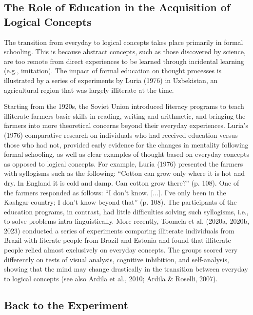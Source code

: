 \documentclass[authordate, reflection, issue]{jote-new-article}
\begin{document}
	\subsection{The Role of Education in the Acquisition of Logical Concepts}



	The transition from everyday to logical concepts takes place primarily in formal schooling. This is because abstract concepts, such as those discovered by science, are too remote from direct experiences to be learned through incidental learning (e.g., imitation). The impact of formal education on thought processes is illustrated by a series of experiments by Luria (1976) in Uzbekistan, an agricultural region that was largely illiterate at the time.



	Starting from the 1920s, the Soviet Union introduced literacy programs to teach illiterate farmers basic skills in reading, writing and arithmetic, and bringing the farmers into more theoretical concerns beyond their everyday experiences. Luria's (1976) comparative research on individuals who had received education versus those who had not, provided early evidence for the changes in mentality following formal schooling, as well as clear examples of thought based on everyday concepts as opposed to logical concepts. For example, Luria (1976) presented the farmers with syllogisms such as the following: “Cotton can grow only where it is hot and dry. In England it is cold and damp. Can cotton grow there?” (p. 108). One of the farmers responded as follows: “I don't know. [...]. I've only been in the Kashgar country; I don't know beyond that” (p. 108). The participants of the education programs, in contrast, had little difficulties solving such syllogisms, i.e., to solve problems intra-linguistically. More recently, Toomela et al. (2020a, 2020b, 2023) conducted a series of experiments comparing illiterate individuals from Brazil with literate people from Brazil and Estonia and found that illiterate people relied almost exclusively on everyday concepts. The groups scored very differently on tests of visual analysis, cognitive inhibition, and self-analysis, showing that the mind may change drastically in the transition between everyday to logical concepts (see also Ardila et al., 2010; Ardila \& Roselli, 2007).



	\subsection{Back to the Experiment}
\end{document}
